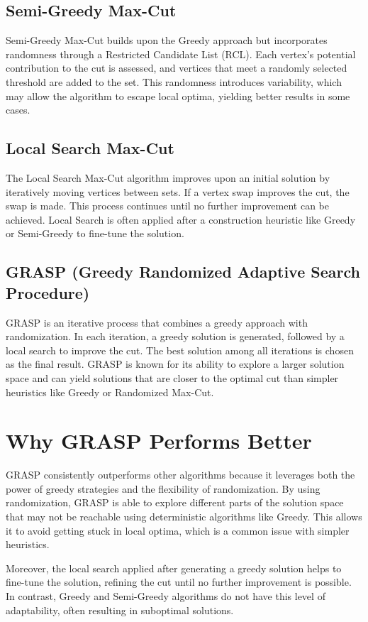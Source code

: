 \documentclass[a4paper,12pt]{article}
\begin{document}
\subsection*{Semi-Greedy Max-Cut}
Semi-Greedy Max-Cut builds upon the Greedy approach but incorporates randomness through a Restricted Candidate List (RCL). Each vertex’s potential contribution to the cut is assessed, and vertices that meet a randomly selected threshold are added to the set. This randomness introduces variability, which may allow the algorithm to escape local optima, yielding better results in some cases.

\subsection*{Local Search Max-Cut}
The Local Search Max-Cut algorithm improves upon an initial solution by iteratively moving vertices between sets. If a vertex swap improves the cut, the swap is made. This process continues until no further improvement can be achieved. Local Search is often applied after a construction heuristic like Greedy or Semi-Greedy to fine-tune the solution.

\subsection*{GRASP (Greedy Randomized Adaptive Search Procedure)}
GRASP is an iterative process that combines a greedy approach with randomization. In each iteration, a greedy solution is generated, followed by a local search to improve the cut. The best solution among all iterations is chosen as the final result. GRASP is known for its ability to explore a larger solution space and can yield solutions that are closer to the optimal cut than simpler heuristics like Greedy or Randomized Max-Cut.

\section*{Why GRASP Performs Better}

GRASP consistently outperforms other algorithms because it leverages both the power of greedy strategies and the flexibility of randomization. By using randomization, GRASP is able to explore different parts of the solution space that may not be reachable using deterministic algorithms like Greedy. This allows it to avoid getting stuck in local optima, which is a common issue with simpler heuristics.

Moreover, the local search applied after generating a greedy solution helps to fine-tune the solution, refining the cut until no further improvement is possible. In contrast, Greedy and Semi-Greedy algorithms do not have this level of adaptability, often resulting in suboptimal solutions.
\end{document}
